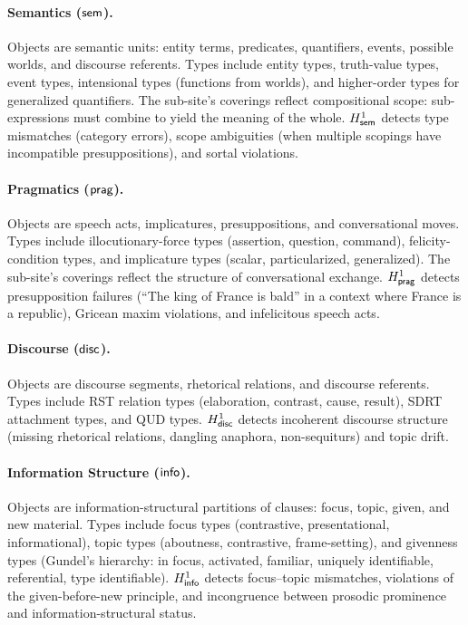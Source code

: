 \paragraph{Semantics ($\mathsf{sem}$).}
Objects are semantic units: entity terms, predicates, quantifiers,
events, possible worlds, and discourse referents.  Types include
entity types, truth-value types, event types, intensional types
(functions from worlds), and higher-order types for generalized
quantifiers.  The sub-site's coverings reflect compositional scope:
sub-expressions must combine to yield the meaning of the whole.
$H^1_{\mathsf{sem}}$ detects type mismatches (category errors), scope
ambiguities (when multiple scopings have incompatible presuppositions),
and sortal violations.

\paragraph{Pragmatics ($\mathsf{prag}$).}
Objects are speech acts, implicatures, presuppositions, and
conversational moves.  Types include illocutionary-force types
(assertion, question, command), felicity-condition types, and
implicature types (scalar, particularized, generalized).  The
sub-site's coverings reflect the structure of conversational exchange.
$H^1_{\mathsf{prag}}$ detects presupposition failures (``The king of France
is bald'' in a context where France is a republic), Gricean maxim
violations, and infelicitous speech acts.

\paragraph{Discourse ($\mathsf{disc}$).}
Objects are discourse segments, rhetorical relations, and discourse
referents.  Types include RST relation types (elaboration, contrast,
cause, result), SDRT attachment types, and QUD types.  $H^1_{\mathsf{disc}}$
detects incoherent discourse structure (missing rhetorical relations,
dangling anaphora, non-sequiturs) and topic drift.

\paragraph{Information Structure ($\mathsf{info}$).}
Objects are information-structural partitions of clauses: focus,
topic, given, and new material.  Types include focus types
(contrastive, presentational, informational), topic types (aboutness,
contrastive, frame-setting), and givenness types (Gundel's hierarchy:
in focus, activated, familiar, uniquely identifiable, referential,
type identifiable).  $H^1_{\mathsf{info}}$ detects focus--topic mismatches,
violations of the given-before-new principle, and incongruence
between prosodic prominence and information-structural status.

